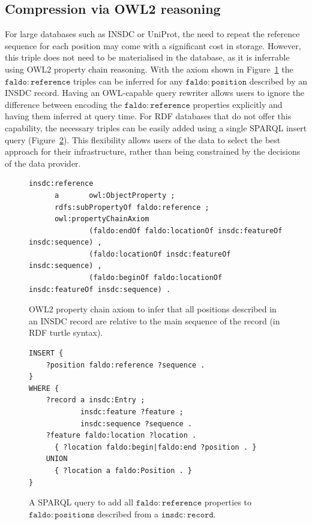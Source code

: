 \subsection*{Compression via OWL2 reasoning}
For large databases such as INSDC or UniProt,
the need to repeat the reference sequence for each position may come with a significant cost in storage.
However, this triple does not need to be materialised in the database, as it is inferrable using OWL2 property chain reasoning.
With the axiom shown in Figure~\ref{owl:chainProperty} the $\mathtt{faldo\colon{}reference}$ triples can be inferred for any $\mathtt{faldo\colon{}position}$ described by an INSDC record.
Having an OWL-capable query rewriter allows users to ignore the difference between encoding the $\mathtt{faldo\colon{}reference}$ properties explicitly and having them inferred at query time.
For RDF databases that do not offer this capability,
the necessary triples can be easily added using a single SPARQL insert query (Figure~\ref{sparql:chainProperty}).
This flexibility allows users of the data to select the best approach for their infrastructure, rather than being constrained by the decisions of the data provider.

\begin{figure}
\begin{shaded}
\small
\begin{verbatim}
insdc:reference
      a       owl:ObjectProperty ;
      rdfs:subPropertyOf faldo:reference ;
      owl:propertyChainAxiom
              (faldo:endOf faldo:locationOf insdc:featureOf insdc:sequence) , 
              (faldo:locationOf insdc:featureOf insdc:sequence) , 
              (faldo:beginOf faldo:locationOf insdc:featureOf insdc:sequence) .

\end{verbatim}
\end{shaded}
\caption{OWL2 property chain axiom to infer that all positions described in an INSDC record are relative to the main sequence of the record (in RDF turtle syntax).}
\label{owl:chainProperty}
\end{figure}

\begin{figure}
\begin{shaded}
\small
\begin{verbatim}
INSERT {
    ?position faldo:reference ?sequence .
}
WHERE {
    ?record a insdc:Entry ;
            insdc:feature ?feature ;
            insdc:sequence ?sequence .
    ?feature faldo:location ?location .
      { ?location faldo:begin|faldo:end ?position . }
    UNION
      { ?location a faldo:Position . }
}
\end{verbatim}
\end{shaded}
\caption{A SPARQL query to add all $\mathtt{faldo\colon{}reference}$ properties to $\mathtt{faldo\colon{}positions}$ described from a $\mathtt{insdc\colon{}record}$.}
\label{sparql:chainProperty}
\end{figure}

